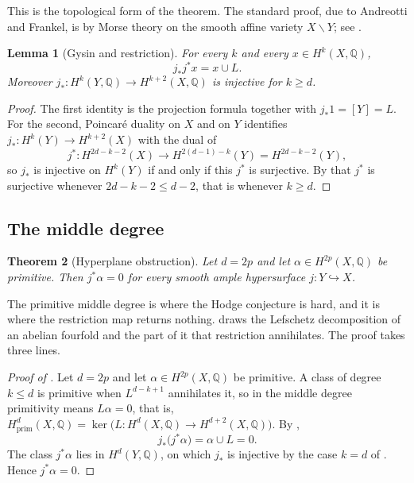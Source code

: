 \documentclass[11pt,reqno]{amsart}
\theoremstyle{plain}
\newtheorem{theorem}{Theorem}[section]
\newtheorem{lemma}[theorem]{Lemma}
\theoremstyle{definition}
\theoremstyle{remark}
\newcommand{\QQ}{\mathbb{Q}}
\begin{document}
This is the topological form of the theorem. The standard proof, due to
Andreotti and Frankel, is by Morse theory on the smooth affine variety
$X\smallsetminus Y$; see \cite[Chapter~1]{Voi03}.

\begin{lemma}[Gysin and restriction]\label{lem:gysinrestrict}
For every $k$ and every $x\in H^{k}(X,\QQ)$,
\[
  j_{*}j^{*}x=x\cup L .
\]
Moreover $j_{*}\colon H^{k}(Y,\QQ)\to H^{k+2}(X,\QQ)$ is injective for
$k\ge d$.
\end{lemma}

\begin{proof}
The first identity is the projection formula together with
$j_{*}1=[Y]=L$. For the second, Poincar\'e duality on $X$ and on $Y$
identifies $j_{*}\colon H^{k}(Y)\to H^{k+2}(X)$ with the dual of
\[
  j^{*}\colon H^{2d-k-2}(X)\longrightarrow H^{2(d-1)-k}(Y)=H^{2d-k-2}(Y),
\]
so $j_{*}$ is injective on $H^{k}(Y)$ if and only if this $j^{*}$ is
surjective. By  that $j^{*}$ is surjective whenever
$2d-k-2\le d-2$, that is whenever $k\ge d$.
\end{proof}

\subsection{The middle degree}

\begin{theorem}[Hyperplane obstruction]\label{thm:hyperplane}
Let $d=2p$ and let $\alpha\in H^{2p}(X,\QQ)$ be primitive. Then
$j^{*}\alpha=0$ for every smooth ample hypersurface $j\colon Y\hookrightarrow X$.
\end{theorem}

The primitive middle degree is where the Hodge conjecture is hard, and it is
where the restriction map returns nothing.  draws the
Lefschetz decomposition of an abelian fourfold and the part of it that
restriction annihilates. The proof takes three lines.

\begin{proof}[Proof of ]
Let $d=2p$ and let $\alpha\in H^{2p}(X,\QQ)$ be primitive. A class of degree
$k\le d$ is primitive when $L^{d-k+1}$ annihilates it, so in the middle degree
primitivity means $L\alpha=0$, that is,
$H^{d}_{\mathrm{prim}}(X,\QQ)=\ker\bigl(L\colon H^{d}(X,\QQ)\to H^{d+2}(X,\QQ)\bigr)$.
By ,
\[
  j_{*}\bigl(j^{*}\alpha\bigr)=\alpha\cup L=0 .
\]
The class $j^{*}\alpha$ lies in $H^{d}(Y,\QQ)$, on which $j_{*}$ is injective
by the case $k=d$ of . Hence $j^{*}\alpha=0$.
\end{proof}
\end{document}
